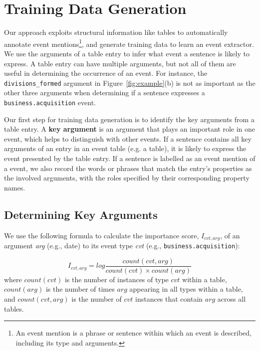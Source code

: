 \section{Training Data Generation}
Our approach exploits structural information like \FB \CVT tables to  automatically annotate event mentions\footnote{An event mention is a
phrase or sentence within which an event is described, including its type and arguments.}, and generate training data to learn an
event extractor. We use the arguments of a \CVT table entry to infer what event a sentence is likely to express. A \CVT table entry can
have multiple arguments, but not all of them are useful in determining the occurrence of an event. For instance, the
\texttt{divisions\_formed} argument in Figure~\ref{fig:example}(b) is not as important as the other three arguments when determining if a
sentence expresses a \texttt{business.acquisition} event.


Our first step for training data generation is to identify the key arguments from a \CVT table entry. A \textbf{key argument} is an
argument that plays an important role in one event, which helps to distinguish with other events. If a sentence contains all key arguments
of an entry in an event table (e.g. a \CVT table), it is likely to express the event presented by the table entry. If a sentence is
labelled as an event mention of a \CVT event, we also record the words or phrases that match the entry's properties as the involved
arguments, with the roles specified by their corresponding property names.


\subsection{Determining Key Arguments}
We use the following formula to calculate the importance score, $I_{cvt, arg}$, of an argument \emph{arg} (e.g., date) to its event type
\emph{cvt} (e.g., \texttt{business.acquisition}):

\begin{equation}
	I_{cvt, arg} = log \frac{count(cvt, arg)}{count(cvt) \times count(arg)}
\end{equation}
%
where $count(cvt)$ is the number of instances of type $cvt$ within a \CVT table, $count(arg)$ is the number of times $arg$ appearing in all
\CVT types within a \CVT table, and $count(cvt, arg)$ is the number of $cvt$ instances that contain $arg$ across all \CVT tables.


